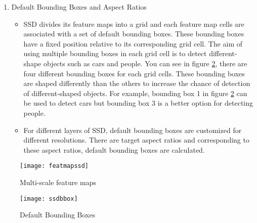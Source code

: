 \documentclass{article}
\begin{document}
\begin{enumerate}
\begin{itemize}
    \end{itemize}
    \item Default Bounding Boxes and Aspect Ratios
    \begin{itemize}
        \item SSD divides its feature maps into a grid and each feature map cells are 
associated with a set of default bounding boxes. These bounding boxes have a fixed position 
relative to its corresponding grid cell. The aim of using multiple bounding boxes 
in each grid cell is to detect different-shape objects such as cars and people. You can see in 
figure \ref{fig:ssdbbox1}, there are four different bounding boxes for each grid cells. These bounding 
boxes are shaped differently than the others to increase the chance of detection of different-shaped 
objects. For example, bounding box 1 in figure \ref{fig:ssdbbox1} can be used to detect cars but 
bounding box 3 is a better option for detecting people.
        \item For different layers of SSD, default bounding boxes are customized for 
different resolutions. There are target aspect ratios and corresponding to these 
aspect ratios, default bounding boxes are calculated.
    \end{itemize}
\end{enumerate}

\begin{figure}
    \centering
    \texttt{[image: featmapssd]}
    \caption{Multi-scale feature maps}
    \label{fig:featmapssd1}
\end{figure}

\begin{figure}
    \centering
    \texttt{[image: ssdbbox]}
    \caption{Default Bounding Boxes}
    \label{fig:ssdbbox1}
\end{figure}
\end{document}
